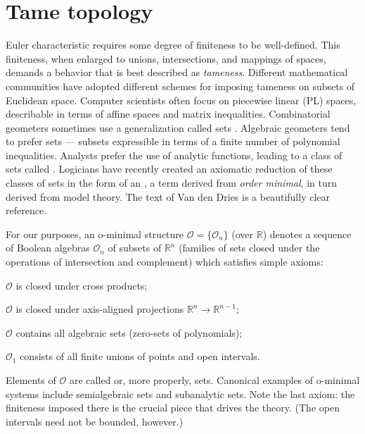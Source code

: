 \documentclass{psapm-l}
\theoremstyle{definition}
\theoremstyle{remark}
\numberwithin{equation}{section}
\begin{document}
\section{Tame topology}
\label{sec:tame}

Euler characteristic requires some degree of finiteness to be well-defined. This finiteness, when enlarged to unions, intersections, and mappings of spaces, demands a behavior that is best described as {\em tameness}. Different mathematical communities have adopted different schemes for imposing tameness on subsets of Euclidean space. Computer scientists often focus on piecewise linear (PL) spaces, describable in terms of affine spaces and matrix inequalities. Combinatorial geometers sometimes use a generalization called {{}} sets \cite{KR,Morelli}. Algebraic geometers tend to prefer {{}} sets --- subsets expressible in terms of a finite number of polynomial inequalities. Analysts prefer the use of analytic functions, leading to a class of sets called {{}} \cite{Shiota}. Logicians have recently created an axiomatic reduction of these classes of sets in the form of an {{}}, a term derived from {\em order minimal}, in turn derived from model theory. The text of Van den Dries \cite{vdD} is a beautifully clear reference.

For our purposes, an o-minimal structure ${{\mathcal O}}=\{{{\mathcal O}}_n\}$ (over ${{\mathbb R}}$) denotes a sequence of Boolean algebras ${{\mathcal O}}_n$ of subsets of ${{\mathbb R}}^n$ (families of sets closed under the operations of intersection and complement) which satisfies simple axioms:
\begin{enumerate*}
\item ${{\mathcal O}}$ is closed under cross products;
\item ${{\mathcal O}}$ is closed under axis-aligned projections ${{\mathbb R}}^{n}\to{{\mathbb R}}^{n-1}$;
\item ${{\mathcal O}}$ contains all algebraic sets (zero-sets of polynomials);
\item ${{\mathcal O}}_1$ consists of all finite unions of points and open intervals.
\end{enumerate*}
Elements of ${{\mathcal O}}$ are called {{}} or, more properly, {{}} sets. Canonical examples of o-minimal systems include semialgebraic sets and subanalytic sets. Note the last axiom: the finiteness imposed there is the crucial piece that drives the theory. (The open intervals need not be bounded, however.)
\end{document}
